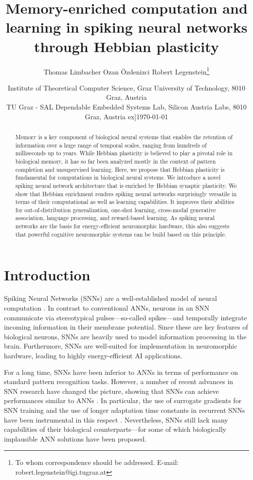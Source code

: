 \documentclass{article}
\title{Memory-enriched computation and learning in spiking neural networks through Hebbian plasticity}
\author{Thomas Limbacher \And Ozan \"Ozdenizci \And Robert Legenstein\thanks{To whom correspondence should be addressed. E-mail: robert.legenstein@igi.tugraz.at}}
\date{
	Institute of Theoretical Computer Science, Graz University of Technology, 8010 Graz, Austria \\
	TU Graz - SAL Dependable Embedded Systems Lab, Silicon Austria Labs, 8010 Graz, Austria \4ex]\today
}
\begin{document}
\maketitle

\begin{abstract}
Memory is a key component of biological neural systems that enables the retention of information over a huge range of temporal scales, ranging from hundreds of milliseconds up to years. While Hebbian plasticity is believed to play a pivotal role in biological memory, it has so far been analyzed mostly in the context of pattern completion and unsupervised learning. Here, we propose that Hebbian plasticity is fundamental for computations in biological neural systems. We introduce a novel spiking neural network architecture that is enriched by Hebbian synaptic plasticity. We show that Hebbian enrichment renders spiking neural networks surprisingly versatile in terms of their computational as well as learning capabilities. It improves their abilities for out-of-distribution generalization, one-shot learning, cross-modal generative association, language processing, and reward-based learning. As spiking neural networks are the basis for energy-efficient neuromorphic hardware, this also suggests that powerful cognitive neuromorphic systems can be build based on this principle.
\end{abstract}



\section{Introduction}
Spiking Neural Networks (SNNs) are a well-established model of neural computation \cite{maass2001pulsed}. In contrast to conventional \glspl{ANN}, neurons in an SNN communicate via stereotypical pulses---so-called spikes---and temporally integrate incoming information in their membrane potential. Since these are key features of biological neurons, SNNs are heavily used to model information processing in the brain. Furthermore, SNNs are well-suited for implementation in neuromorphic hardware, leading to highly energy-efficient AI applications. 

For a long time, SNNs have been inferior to \glspl{ANN} in terms of performance on standard pattern recognition tasks. However, a number of recent advances in SNN research have changed the picture, showing that SNNs can achieve performances similar to \glspl{ANN} \cite{tavanaei2019deep}. In particular, the use of surrogate gradients for SNN training \cite{bellec2018long,huh2018gradient,zenke2018superspike,neftci2019surrogate} and the use of longer adaptation time constants in recurrent SNNs have been instrumental in this respect \cite{salaj2021spike}. Nevertheless, SNNs still lack many capabilities of their biological counterparts---for some of which biologically implausible \gls{ANN} solutions have been proposed.  
\end{document}
